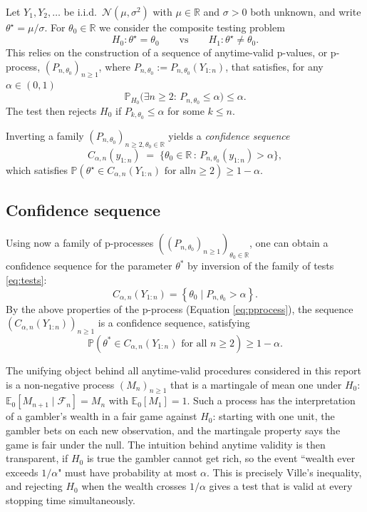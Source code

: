 \documentclass[12pt, a4paper]{report}
\newcommand{\E}{\mathbb{E}}
\newcommand{\Prob}{\mathbb{P}}
\newcommand{\1}{\mathbf{1}}
\begin{document}
Let \(Y_1,Y_2,\ldots\) be i.i.d.\ \(\mathcal N(\mu,\sigma^2)\) with
\(\mu\in\mathbb{R}\) and \(\sigma>0\) both unknown, and write
\(\theta^\star=\mu/\sigma\). For \(\theta_0\in\mathbb{R}\) we consider the
composite testing problem
\begin{equation}\label{eq:tests}
   H_0\!:\theta^\star=\theta_0 \qquad\text{vs}\qquad
   H_1\!:\theta^\star\neq\theta_0.
\end{equation}
This relies on the construction of a sequence of anytime-valid p-values, or p-process, $(P_{n,\theta_0})_{n\geq 1}$, where $P_{n,\theta_0}:=P_{n,\theta_0}(Y_{1:n})$, that satisfies, for any $\alpha\in (0,1)$
\begin{equation}\label{eq:pprocess}
   \Prob_{H_0}\!\bigl(\exists n\geq 2:\, P_{n,\theta_0}\leq \alpha\bigr)
   \leq \alpha.
\end{equation}
The test then rejects $H_0$ if $P_{k,\theta_0}\leq \alpha$ for some $k\leq n$. 

Inverting a family \((P_{n,\theta_0})_{n\geq 2,\theta_0\in\mathbb{R}}\) yields
a \emph{confidence sequence}
\begin{equation}\label{eq:CS-from-pproc}
   C_{\alpha,n}(y_{1:n})
   \;=\;\bigl\{\theta_0\in\mathbb{R}\,:\,P_{n,\theta_0}(y_{1:n})>\alpha\bigr\},
\end{equation}
which satisfies
\(\Prob(\theta^\star\in C_{\alpha,n}(Y_{1:n})\text{ for all
}n\geq 2)\geq 1-\alpha\).



\subsection{Confidence sequence}

Using now a family of p-processes $((P_{n,\theta_0})_{n\geq 1})_{\theta_0\in\mathbb R}$, one can obtain a confidence sequence for the parameter $\theta^*$ by inversion of the family of tests \eqref{eq:tests}:
$$
C_{\alpha,n}(Y_{1:n})=\left\{ \theta_0 \mid P_{n,\theta_0}> \alpha\right \}.
$$
By the above properties of the p-process (Equation \eqref{eq:pprocess}), the sequence $(C_{\alpha,n}(Y_{1:n}))_{n \geq 1}$ is a confidence sequence, satisfying
$$
\mathbb P(\theta^*  \in C_{\alpha,n}(Y_{1:n}) \text{ for all }n\geq 2)\geq 1-\alpha.
$$

The unifying object behind all anytime-valid procedures considered in
this report is a non-negative process \((M_n)_{n\geq 1}\) that is a
martingale of mean one under \(H_0\): \(\E_0[M_{n+1}\mid\mathcal{F}_n]
=M_n\) with \(\E_0[M_1]=1\). Such a process has the interpretation of a
gambler's wealth in a fair game against \(H_0\): starting with one
unit, the gambler bets on each new observation, and the martingale
property says the game is fair under the null. The intuition behind
anytime validity is then transparent, if \(H_0\) is true the gambler
cannot get rich, so the event ``wealth ever exceeds \(1/\alpha\)" must
have probability at most \(\alpha\). This is precisely Ville's
inequality, and rejecting \(H_0\) when the wealth crosses \(1/\alpha\)
gives a test that is valid at every stopping time simultaneously.
\end{document}

